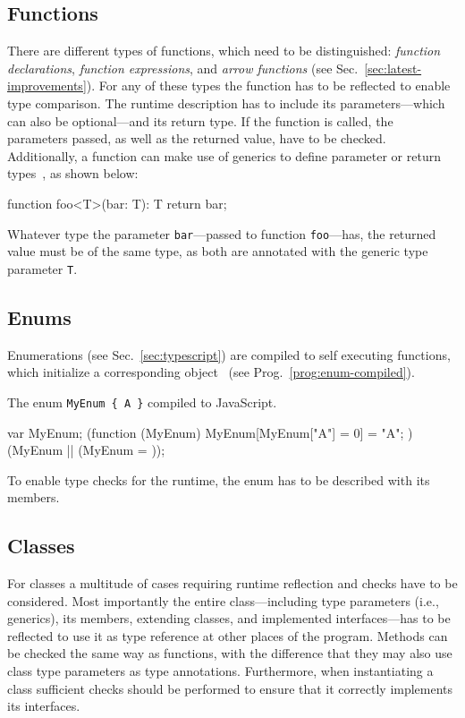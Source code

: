 \subsection{Functions}

There are different types of functions, which need to be distinguished: \emph{function declarations}, \emph{function expressions}, and \emph{arrow functions} (see Sec.~\ref{sec:latest-improvements}). For any of these types the function has to be reflected to enable type comparison. The runtime description has to include its parameters---which can also be optional---and its return type. If the function is called, the parameters passed, as well as the returned value, have to be checked. Additionally, a function can make use of generics to define parameter or return types~\cite{TypeScriptHandbook:Generics}, as shown below:
\begin{JsCode}[numbers=none]
function foo<T>(bar: T): T {
  return bar;
} 
\end{JsCode}
Whatever type the parameter \texttt{bar}---passed to function \texttt{foo}---has, the returned value must be of the same type, as both are annotated with the generic type parameter \texttt{T}.

\subsection{Enums}

Enumerations (see Sec.~\ref{sec:typescript}) are compiled to self executing functions, which initialize a corresponding object~\cite{TypeScriptHandbook:Enums} (see Prog.~\ref{prog:enum-compiled}).
\begin{program}
\caption{The enum \texttt{MyEnum \{ A \}} compiled to JavaScript.~\cite{TypeScriptHandbook:Enums}}
\label{prog:enum-compiled}
\begin{JsCode}
var MyEnum;
(function (MyEnum) {
    MyEnum[MyEnum["A"] = 0] = "A";
})(MyEnum || (MyEnum = {}));
\end{JsCode}
\end{program}
To enable type checks for the runtime, the enum has to be described with its members.

\subsection{Classes}

For classes a multitude of cases requiring runtime reflection and checks have to be considered. Most importantly the entire class---including type parameters (i.e., generics), its members, extending classes, and implemented interfaces---has to be reflected to use it as type reference at other places of the program. Methods can be checked the same way as functions, with the difference that they may also use class type parameters as type annotations. Furthermore, when instantiating a class sufficient checks should be performed to ensure that it correctly implements its interfaces.

